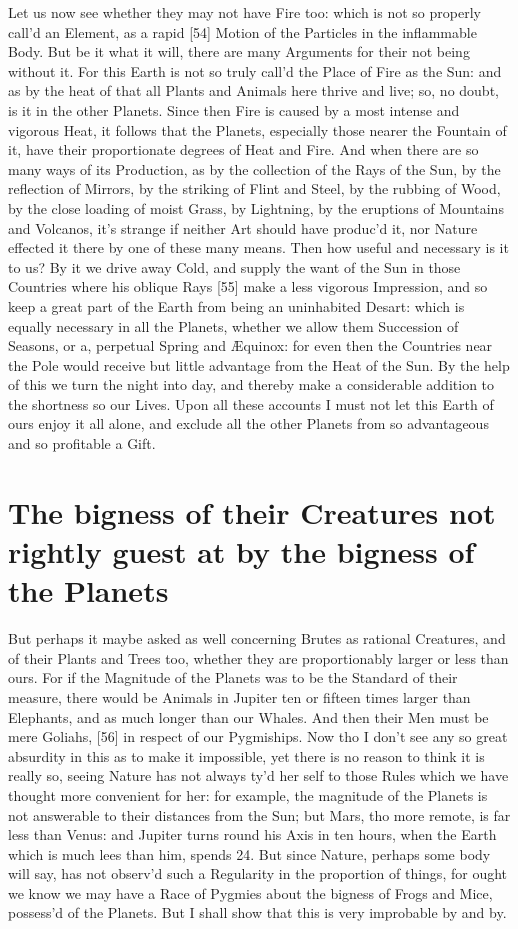 \documentclass[letterpaper]{book}
\begin{document}
Let us now see whether they may not have Fire too: which is not so properly
call'd an Element, as a rapid [54] Motion of the Particles in the
inflammable Body. But be it what it will, there are many Arguments for their
not being without it. For this Earth is not so truly call'd the Place of
Fire as the Sun: and as by the heat of that all Plants and Animals here
thrive and live; so, no doubt, is it in the other Planets. Since then Fire
is caused by a most intense and vigorous Heat, it follows that the Planets,
especially those nearer the Fountain of it, have their proportionate degrees
of Heat and Fire. And when there are so many ways of its Production, as by
the collection of the Rays of the Sun, by the reflection of Mirrors, by the
striking of Flint and Steel, by the rubbing of Wood, by the close loading of
moist Grass, by Lightning, by the eruptions of Mountains and Volcanos, it's
strange if neither Art should have produc'd it, nor Nature effected it there
by one of these many means.  Then how useful and necessary is it to us? By
it we drive away Cold, and supply the want of the Sun in those Countries
where his oblique Rays [55] make a less vigorous Impression, and so keep a
great part of the Earth from being an uninhabited Desart: which is equally
necessary in all the Planets, whether we allow them Succession of Seasons,
or a, perpetual Spring and Æquinox: for even then the Countries near the
Pole would receive but little advantage from the Heat of the Sun. By the
help of this we turn the night into day, and thereby make a considerable
addition to the shortness so our Lives. Upon all these accounts I must not
let this Earth of ours enjoy it all alone, and exclude all the other Planets
from so advantageous and so profitable a Gift.


\section{The bigness of their Creatures not rightly guest at by the bigness
of the Planets}

But perhaps it maybe asked as well concerning Brutes as rational Creatures,
and of their Plants and Trees too, whether they are proportionably larger or
less than ours. For if the Magnitude of the Planets was to be the Standard
of their measure, there would be Animals in Jupiter ten or fifteen times
larger than Elephants, and as much longer than our Whales. And then their
Men must be mere Goliahs, [56] in respect of our Pygmiships. Now tho I don't
see any so great absurdity in this as to make it impossible, yet there is no
reason to think it is really so, seeing Nature has not always ty'd her self
to those Rules which we have thought more convenient for her: for example,
the magnitude of the Planets is not answerable to their distances from the
Sun; but Mars, tho more remote, is far less than Venus: and Jupiter turns
round his Axis in ten hours, when the Earth which is much lees than him,
spends 24. But since Nature, perhaps some body will say, has not observ'd
such a Regularity in the proportion of things, for ought we know we may have a
Race of Pygmies about the bigness of Frogs and Mice, possess'd of the
Planets. But I shall show that this is very improbable by and by.
\end{document}
